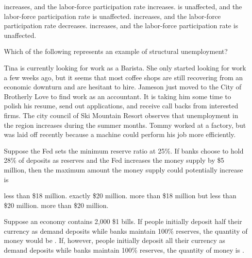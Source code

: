 \documentclass[addpoints,11pt]{exam}
\theoremstyle{definition}
\newcommand{\blank}[0]{\underline{\hspace{3cm}}}
\begin{document}
\begin{questions}
\begin{choices}
	\choice increases, and the labor-force participation rate increases.
	\CorrectChoice is unaffected, and the labor-force participation rate is unaffected.
	\choice increases, and the labor-force participation rate decreases. 
	\choice increases, and the labor-force participation rate is unaffected.
\end{choices}


\question Which of the following represents an example of structural unemployment?

\begin{choices}
	\choice Tina is currently looking for work as a Barista. She only started looking for work a few weeks ago, but it seems that most coffee shops are still recovering from an economic downturn and are hesitant to hire.
	\choice Jameson just moved to the City of Brotherly Love to find work as an accountant. It is taking him some time to polish his resume, send out applications, and receive call backs from interested firms.
	\choice The city council of Ski Mountain Resort observes that unemployment in the region increases during the summer months.
	\CorrectChoice Tommy worked at a factory, but was laid off recently because a machine could perform his job more efficiently.
\end{choices}


\question Suppose the Fed sets the minimum reserve ratio at 25\%. If banks choose to hold 28\% of deposits as reserves and the Fed increases the money supply by \$5 million, then the maximum amount the money supply could potentially increase is


\begin{choices}
	\CorrectChoice less than \$18 million.
	\choice exactly \$20 million.
	\choice more than \$18 million but less than \$20 million.
	\choice more than \$20 million.
\end{choices}
	
	
\question Suppose an economy contains 2,000 \$1 bills. If people initially deposit half their currency as demand deposits while banks maintain 100\% reserves, the quantity of money would be \blank. If, however, people initially deposit all their currency as demand deposits while banks maintain 100\% reserves, the quantity of money is \blank.


\end{questions}
\end{document}
